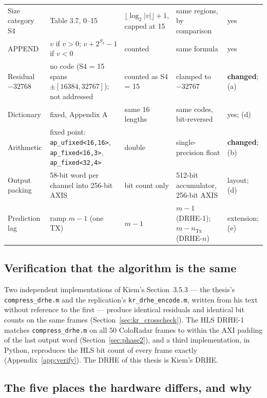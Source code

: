 \begin{table}[p]
\begin{tabular}{@{}>{\raggedright}p{}>{\raggedright}p{}>{\raggedright}p{}>{\raggedright}p{}>{\raggedright\arraybackslash}p{}@{}}
Size category S4 & Table 3.7, 0--15 & $\lfloor\log_2|v|\rfloor+1$, capped at 15 & same regions, by comparison & yes\\
APPEND & $v$ if $v>0$; $v + 2^{S_4} - 1$ if $v<0$ & counted & same formula & yes\\
Residual $-32768$ & no code (S4 = 15 spans $\pm[16384, 32767]$); not addressed & counted as S4 = 15 & clamped to $-32767$ & \textbf{changed}; (a)\\
Dictionary & fixed, Appendix A & same 16 lengths & same codes, bit-reversed & yes; (d)\\
Arithmetic & fixed point: \texttt{ap\_ufixed<16,16>}, \texttt{ap\_fixed<16,3>}, \texttt{ap\_fixed<32,4>} & double & single-precision float & \textbf{changed}; (b)\\
Output packing & 58-bit word per channel into 256-bit AXIS & bit count only & 512-bit accumulator, 256-bit AXIS & layout; (d)\\
Prediction lag & ramp $m-1$ (one TX) & $m-1$ & $m-1$ (DRHE-1); $m-n_{\mathrm{Tx}}$ (DRHE-$n$) & extension; (e)\\
\bottomrule
\end{tabular}
\end{table}

\subsection{Verification that the algorithm is the same}

Two independent implementations of Kiem's Section~3.5.3 --- the thesis's
\texttt{compress\_drhe.m} and the replication's \texttt{kr\_drhe\_encode.m},
written from his text without reference to the first --- produce identical
residuals and identical bit counts on the same frames
(Section~\ref{sec:kr_crosscheck}). The HLS DRHE-1 matches
\texttt{compress\_drhe.m} on all 50 ColoRadar frames to within the AXI padding
of the last output word (Section~\ref{sec:phase2}), and a third implementation,
in Python, reproduces the HLS bit count of every frame exactly
(Appendix~\ref{app:verify}). The DRHE of this thesis is Kiem's DRHE.

\subsection{The five places the hardware differs, and why}
\label{sec:kc_why}

